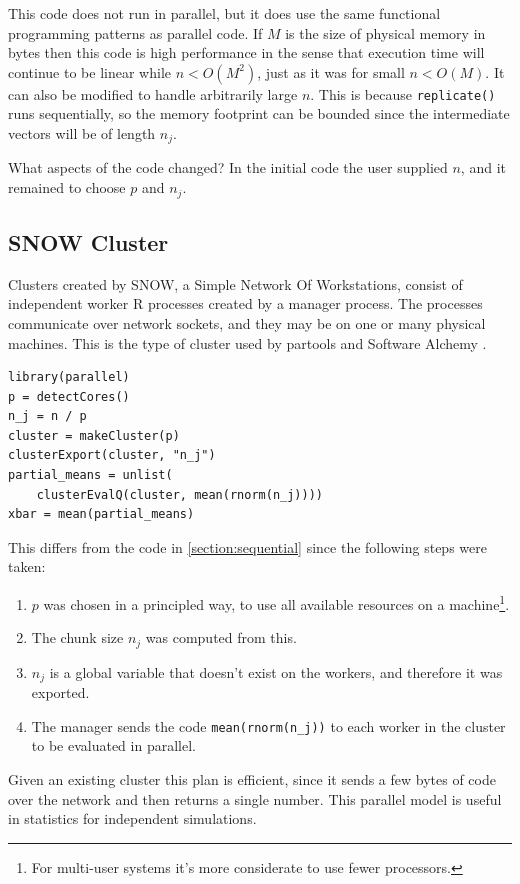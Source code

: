 \documentclass[12pt]{article}
\begin{document}
This code does not run in parallel, but it does use the same functional
programming patterns as parallel code. If $M$ is the size of physical memory in
bytes then this code is high performance in the sense
that execution time will continue to be linear while $n < O(M^2)$, just
as it was for small $n < O(M)$. It can also be modified to handle
arbitrarily large $n$. This is because \texttt{replicate()} runs
sequentially, so the memory footprint can be bounded since the intermediate
vectors will be of length $n_j$. 

What aspects of the code changed? In the initial code the user
supplied $n$, and it remained to choose $p$ and $n_j$.

\subsection{SNOW Cluster}

Clusters created by SNOW, a Simple Network Of Workstations,
consist of independent worker R processes created by a manager process. The
processes communicate over network sockets, and they may be on one or many
physical machines.  This is the type of cluster used by partools and
Software Alchemy \cite{R-partools} \cite{matloff2014software}.  

\begin{verbatim}
library(parallel)
p = detectCores()
n_j = n / p
cluster = makeCluster(p)
clusterExport(cluster, "n_j")
partial_means = unlist(
    clusterEvalQ(cluster, mean(rnorm(n_j))))
xbar = mean(partial_means)
\end{verbatim}

This differs from the code in \ref{section:sequential} since
the following steps were taken:
\begin{enumerate}
    \item $p$ was chosen in a principled way, to use all available
        resources on a machine\footnote{For multi-user systems it's more
        considerate to use fewer processors.}. 
    \item The chunk size $n_j$ was computed from this.
    \item $n_j$ is a global variable that doesn't exist on
        the workers, and therefore it was exported.
    \item The manager sends the code \texttt{mean(rnorm(n\_j))} to each
        worker in the cluster to be evaluated in parallel. 
\end{enumerate}

Given an existing cluster this plan is efficient, since it
sends a few bytes of code over the network and then returns a single
number. This parallel model is useful in statistics for independent
simulations.
\end{document}
